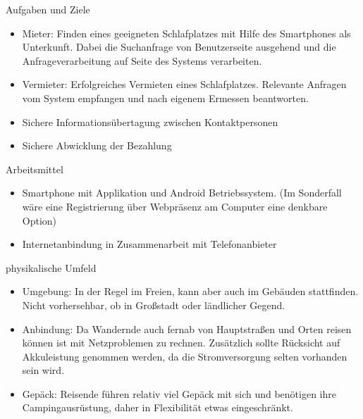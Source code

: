 \newpage


Aufgaben und Ziele
\begin{itemize}
   \item 
   Mieter: Finden eines geeigneten Schlafplatzes mit Hilfe des Smartphones als Unterkunft. Dabei die Suchanfrage von Benutzerseite ausgehend und die Anfrageverarbeitung auf Seite des Systems verarbeiten. 
   \item 
   Vermieter: Erfolgreiches Vermieten eines Schlafplatzes. Relevante Anfragen vom System empfangen und nach eigenem Ermessen beantworten. 
   \item
   Sichere Informationsübertagung zwischen Kontaktpersonen
   \item
   Sichere Abwicklung der Bezahlung\\  


\end{itemize}


Arbeitsmittel
\begin{itemize}
   \item 
   Smartphone mit Applikation und Android Betriebssystem. (Im Sonderfall wäre eine Registrierung über Webpräsenz am Computer eine denkbare Option) 
   \item  
   Internetanbindung in Zusammenarbeit mit Telefonanbieter\\
   

\end{itemize}


physikalische Umfeld
\begin{itemize}

   \item 
   Umgebung: In der Regel im Freien, kann aber auch im Gebäuden stattfinden. Nicht vorhersehbar, ob in Großstadt oder ländlicher Gegend.

   \item
   Anbindung:  Da Wandernde auch fernab von Hauptstraßen und Orten reisen können ist mit Netzproblemen zu rechnen. Zusätzlich sollte Rücksicht auf Akkuleistung genommen werden, da die Stromversorgung selten vorhanden sein wird. 

   \item
   Gepäck: Reisende führen relativ viel Gepäck mit sich und benötigen ihre Campingausrüstung, daher in Flexibilität etwas eingeschränkt.
\end{itemize}



